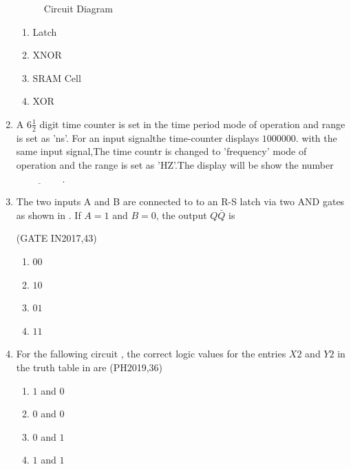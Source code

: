 \begin{enumerate}[label=\arabic*.,ref=\theenumi]
\begin{figure}[H]
\centering
\resizebox{0.5\columnwidth}{!}{%

	}
\caption{Circuit Diagram}
	   \label{fig:GATE-EC2019,15}
\end{figure}
\begin{enumerate}
\item Latch
\item XNOR
\item SRAM Cell
\item XOR
\end{enumerate}
\item A $6{\frac{1}{2}}$ digit time counter is set in the time period mode of operation and range is set as 'ns'. For an input signalthe time-counter displays $1000000$. with the same input signal,The time countr is changed to 'frequency' mode of operation and the range is set as 'HZ'.The display will be show the number$\underline{\hspace{2cm}}$.
\hfill{}
\item The two inputs A and B are connected to to an R-S latch via two AND gates as shown in  
       .
If $A=1$ and $B=0$, the output $Q\bar{Q}$ is
    \begin{figure}[H]
        \centering
	\resizebox{0.75\columnwidth}{!}{%
        
	    }
	    \caption{}
       \label{fig:GATE IN2017,43}
       \end{figure}
       \hfill(GATE IN2017,43)
    \begin{enumerate}
   		\item $00$ 
   		\item $10$ 
   		\item $01$ 
   		\item $11$ 
   
   \end{enumerate}
\item For the fallowing circuit
,
 the correct logic values for the entries $X2$ and $Y2$ in the truth table 
in
 are
\hfill(PH2019,36)
%
\begin{figure}[H]
        \centering
	\resizebox{0.75\columnwidth}{!}{%
        
	}
	\caption{}
\label{fig:PH2019,36}
       \end{figure}

		\begin{table}[H]
			\centering
			\resizebox{0.75\columnwidth}{!}{%
			
			}
	\caption{}
\label{tab:PH2019,36}
		\end{table}



   \begin{enumerate}
\item $1$ and $0$
\item $0$ and $0$
\item $0$ and $1$
\item $1$ and $1$

\end{enumerate}





\end{enumerate}
